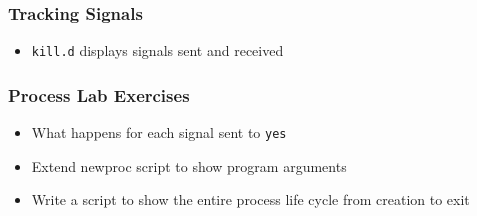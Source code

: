 \documentclass[pdftex]{beamer}
\begin{document}
\begin{frame}[fragile]
  \frametitle{Tracking Signals}
  \begin{itemize}
  \item \verb+kill.d+ displays signals sent and received
  \end{itemize}
\end{frame}

\begin{frame}[fragile]
  \frametitle{Process Lab Exercises}
  \begin{itemize}
  \item What happens for each signal sent to \verb+yes+
  \item Extend newproc script to show program arguments
  \item Write a script to show the entire process life cycle from creation
    to exit
  \end{itemize}
\end{frame}
\end{document}
